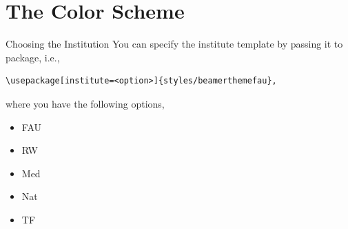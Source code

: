 \documentclass[final]{beamer}
\begin{document}
\section{The Color Scheme}
%
%
%
%
%
\begin{frame}[fragile]{Choosing the Institution}
You can specify the institute template by passing it to package, i.e.,
%
\begin{center}
\begin{verbatim}
\usepackage[institute=<option>]{styles/beamerthemefau},
\end{verbatim}
\end{center}
%
where you have the following options,
\begin{itemize}
\item FAU
\item RW
\item Med
\item Nat
\item TF
\end{itemize}
\end{frame}
%
%
%
%
%
\end{document}
